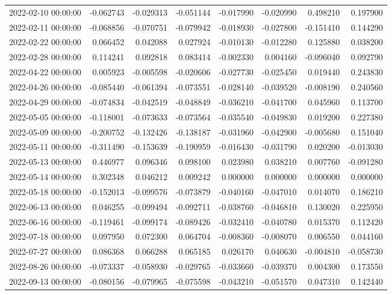 \begin{tabular}{lrrrrrrr}
2022-02-10 00:00:00 & -0.062743 & -0.029313 & -0.051144 & -0.017990 & -0.020990 & 0.498210 & 0.197900 \\
2022-02-11 00:00:00 & -0.068856 & -0.070751 & -0.079942 & -0.018930 & -0.027800 & -0.151410 & 0.144290 \\
2022-02-22 00:00:00 & 0.066452 & 0.042088 & 0.027924 & -0.010130 & -0.012280 & 0.125880 & 0.038200 \\
2022-02-28 00:00:00 & 0.114241 & 0.092818 & 0.083414 & -0.002330 & 0.004160 & -0.096040 & 0.092790 \\
2022-04-22 00:00:00 & 0.005923 & -0.005598 & -0.020606 & -0.027730 & -0.025450 & 0.019440 & 0.243830 \\
2022-04-26 00:00:00 & -0.085440 & -0.061394 & -0.073551 & -0.028140 & -0.039520 & -0.008190 & 0.240560 \\
2022-04-29 00:00:00 & -0.074834 & -0.042519 & -0.048849 & -0.036210 & -0.041700 & 0.045960 & 0.113700 \\
2022-05-05 00:00:00 & -0.118001 & -0.073633 & -0.073564 & -0.035540 & -0.049830 & 0.019200 & 0.227380 \\
2022-05-09 00:00:00 & -0.200752 & -0.132426 & -0.138187 & -0.031960 & -0.042900 & -0.005680 & 0.151040 \\
2022-05-11 00:00:00 & -0.311490 & -0.153639 & -0.190959 & -0.016430 & -0.031790 & 0.020200 & -0.013030 \\
2022-05-13 00:00:00 & 0.446977 & 0.096346 & 0.098100 & 0.023980 & 0.038210 & 0.007760 & -0.091280 \\
2022-05-14 00:00:00 & 0.302348 & 0.046212 & 0.009242 & 0.000000 & 0.000000 & 0.000000 & 0.000000 \\
2022-05-18 00:00:00 & -0.152013 & -0.099576 & -0.073879 & -0.040160 & -0.047010 & 0.014070 & 0.186210 \\
2022-06-13 00:00:00 & 0.046255 & -0.099494 & -0.092711 & -0.038760 & -0.046810 & 0.130020 & 0.225950 \\
2022-06-16 00:00:00 & -0.119461 & -0.099174 & -0.089426 & -0.032410 & -0.040780 & 0.015370 & 0.112420 \\
2022-07-18 00:00:00 & 0.097950 & 0.072300 & 0.064704 & -0.008360 & -0.008070 & 0.006550 & 0.044160 \\
2022-07-27 00:00:00 & 0.086368 & 0.066288 & 0.065185 & 0.026170 & 0.040630 & -0.004810 & -0.058730 \\
2022-08-26 00:00:00 & -0.073337 & -0.058930 & -0.029765 & -0.033660 & -0.039370 & 0.004300 & 0.173550 \\
2022-09-13 00:00:00 & -0.080156 & -0.079965 & -0.075598 & -0.043210 & -0.051570 & 0.047310 & 0.142440 \\

\end{tabular}
